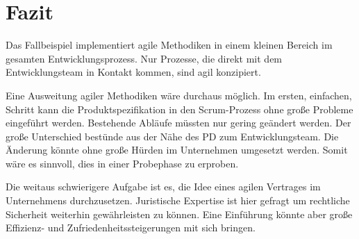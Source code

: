\chapter{Fazit}\label{chap:conclusion}
\chapterstart

Das Fallbeispiel implementiert agile Methodiken in einem kleinen Bereich im gesamten Entwicklungsprozess. Nur Prozesse, die direkt mit dem Entwicklungsteam in Kontakt kommen, sind agil konzipiert.

Eine Ausweitung agiler Methodiken wäre durchaus möglich. Im ersten, einfachen, Schritt kann die Produktspezifikation in den Scrum-Prozess ohne große Probleme eingeführt werden. Bestehende Abläufe müssten nur gering geändert werden. Der große Unterschied bestünde aus der Nähe des \ac{PD} zum Entwicklungsteam. Die Änderung könnte ohne große Hürden im Unternehmen umgesetzt werden. Somit wäre es sinnvoll, dies in einer Probephase zu erproben.

Die weitaus schwierigere Aufgabe ist es, die Idee eines agilen Vertrages im Unternehmens durchzusetzen. Juristische Expertise ist hier gefragt um rechtliche Sicherheit weiterhin gewährleisten zu können. Eine Einführung könnte aber große Effizienz- und Zufriedenheitssteigerungen mit sich bringen.  

\chapterend

